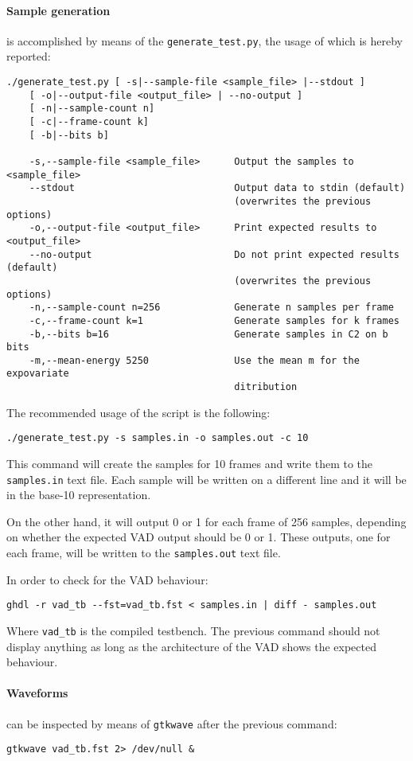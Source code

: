 \paragraph{Sample generation} is accomplished by means of the
\texttt{generate\_test.py}, the usage of which is hereby reported:
\footnotesize{
\begin{verbatim}
./generate_test.py [ -s|--sample-file <sample_file> |--stdout ]
    [ -o|--output-file <output_file> | --no-output ]
    [ -n|--sample-count n]
    [ -c|--frame-count k]
    [ -b|--bits b]

    -s,--sample-file <sample_file>      Output the samples to <sample_file>
    --stdout                            Output data to stdin (default)
                                        (overwrites the previous options)
    -o,--output-file <output_file>      Print expected results to <output_file>
    --no-output                         Do not print expected results (default)
                                        (overwrites the previous options)
    -n,--sample-count n=256             Generate n samples per frame
    -c,--frame-count k=1                Generate samples for k frames
    -b,--bits b=16                      Generate samples in C2 on b bits
    -m,--mean-energy 5250               Use the mean m for the expovariate
                                        ditribution    
\end{verbatim}
}

The recommended usage of the script is the following:
\begin{verbatim}
./generate_test.py -s samples.in -o samples.out -c 10
\end{verbatim}
This command will create the samples for 10 frames and write them to the
\texttt{samples.in} text file. Each sample will be written on a different line
and it will be in the base-10 representation.

On the other hand, it will output 0 or 1 for each frame of 256 samples, depending
on whether the expected VAD output should be 0 or 1. These outputs, one for each
frame, will be written to the \texttt{samples.out} text file.

In order to check for the VAD behaviour:
\begin{verbatim}
ghdl -r vad_tb --fst=vad_tb.fst < samples.in | diff - samples.out
\end{verbatim}
Where \texttt{vad\_tb} is the compiled testbench. The previous command should not
display anything as long as the architecture of the VAD shows the expected
behaviour.

\paragraph{Waveforms} can be inspected by means of \texttt{gtkwave} after
the previous command:
\begin{verbatim}
gtkwave vad_tb.fst 2> /dev/null &
\end{verbatim}
